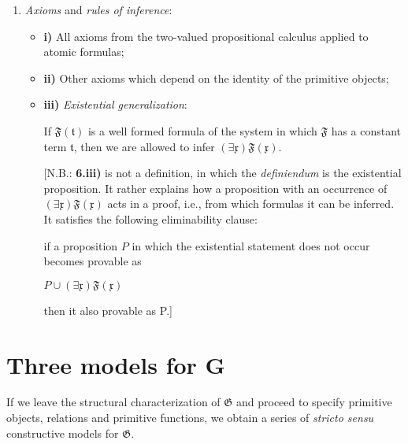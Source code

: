 \documentclass[12pt]{article}
\begin{document}
\begin{enumerate}
\item \emph{Axioms} and \emph{rules of inference}:

\begin{itemize}
\item \textbf{i)} All axioms from the two-valued propositional calculus applied to atomic formulas;

\item \textbf{ii)} Other axioms which depend on the identity of the primitive objects;

\item \textbf{iii)} \emph{Existential generalization}:

If $\mathfrak{F} (\mathfrak{t})$ is a well formed formula of the system in which $\mathfrak{F}$ has a constant term $\mathfrak{t}$, then we are allowed to infer $(\exists \mathfrak{x}) \mathfrak{F} (\mathfrak{x}).$

[N.B.: \textbf{6.iii)} is not a definition, in which the \emph{definiendum} is the existential proposition. It rather explains how a proposition with an occurrence of $(\exists \mathfrak{x}) \mathfrak{F} (\mathfrak{x})$ acts in a proof, i.e., from which formulas it can be inferred. It satisfies the following eliminability clause:

\begin{center}
if a proposition $P$ in which the existential statement does not occur becomes provable as

$P \cup (\exists \mathfrak{x}) \mathfrak{F} (\mathfrak{x})$ 

then it also provable as P.]
\end{center}
\end{itemize}
\end{enumerate}

\section{Three models for G}\normalsize

If we leave the structural characterization of $\mathfrak{G}$ and proceed to specify primitive objects, relations and primitive functions, we obtain a series of \emph{stricto sensu} constructive models for $\mathfrak{G}$.
\end{document}
